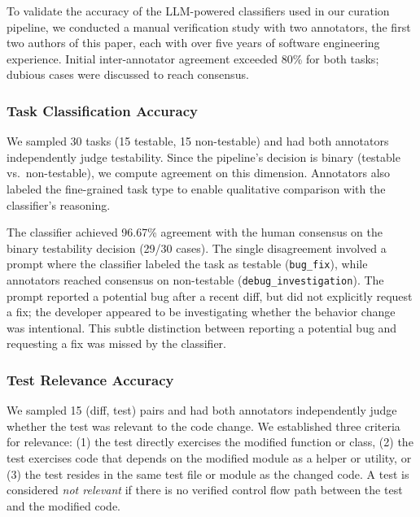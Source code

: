 To validate the accuracy of the LLM-powered classifiers used in our curation pipeline, we conducted a manual verification study with two annotators, the first two authors of this paper, each with over five years of software engineering experience. Initial inter-annotator agreement exceeded 80\% for both tasks; dubious cases were discussed to reach consensus.

\subsubsection{Task Classification Accuracy}
We sampled 30 tasks (15 testable, 15 non-testable) and had both annotators independently judge testability. Since the pipeline's decision is binary (testable vs.\ non-testable), we compute agreement on this dimension. Annotators also labeled the fine-grained task type to enable qualitative comparison with the classifier's reasoning.

The classifier achieved 96.67\% agreement with the human consensus on the binary testability decision (29/30 cases). The single disagreement involved a prompt where the classifier labeled the task as testable (\texttt{bug\_fix}), while annotators reached consensus on non-testable (\texttt{debug\_investigation}). The prompt reported a potential bug after a recent diff, but did not explicitly request a fix; the developer appeared to be investigating whether the behavior change was intentional. This subtle distinction between reporting a potential bug and requesting a fix was missed by the classifier.

\subsubsection{Test Relevance Accuracy}

We sampled 15 (diff, test) pairs and had both annotators independently judge whether the test was relevant to the code change. We established three criteria for relevance: (1) the test directly exercises the modified function or class, (2) the test exercises code that depends on the modified module as a helper or utility, or (3) the test resides in the same test file or module as the changed code. A test is considered \textit{not relevant} if there is no verified control flow path between the test and the modified code.


